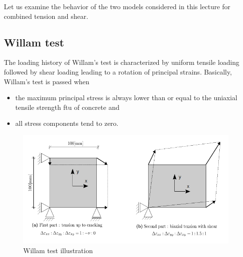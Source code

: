 \documentclass[main.tex]{subfiles}
\begin{document}
Let us examine the behavior of the two models considered in this lecture for combined tension and shear.

\subsection{Willam test}

The
loading history of Willam’s test is characterized by uniform tensile loading followed by shear
loading leading to a rotation of principal strains. Basically, Willam’s test is passed when 
\begin{itemize}
\item the
maximum principal stress is always lower than or equal to the uniaxial tensile strength ftu of
concrete and 
\item all stress components tend to zero.
\end{itemize}

\begin{figure}
\centering
\includegraphics[width=12cm]{fig/Willam-test-illustration.png}
\caption{Willam test illustration}
\label{FIGWillamTestIllustration}
\end{figure}
\end{document}

